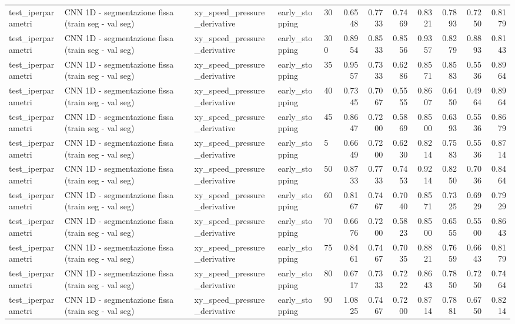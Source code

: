 \documentclass{article}
\begin{document}
\begin{table}[htbp]
\begin{adjustbox}{max width=\textwidth}
\begin{tabular}{lllllrrrrrrr}
test\_iperparametri & CNN 1D - segmentazione fissa (train seg - val seg) & xy\_speed\_pressure\_derivative & early\_stopping & 30 & 0.6548 & 0.7733 & 0.7469 & 0.8321 & 0.7893 & 0.7250 & 0.8179 \\
test\_iperparametri & CNN 1D - segmentazione fissa (train seg - val seg) & xy\_speed\_pressure\_derivative & early\_stopping & 300 & 0.8954 & 0.8533 & 0.8556 & 0.9357 & 0.8279 & 0.8893 & 0.8143 \\
test\_iperparametri & CNN 1D - segmentazione fissa (train seg - val seg) & xy\_speed\_pressure\_derivative & early\_stopping & 35 & 0.9557 & 0.7333 & 0.6286 & 0.8571 & 0.8583 & 0.5536 & 0.8964 \\
test\_iperparametri & CNN 1D - segmentazione fissa (train seg - val seg) & xy\_speed\_pressure\_derivative & early\_stopping & 40 & 0.7345 & 0.7067 & 0.5555 & 0.8607 & 0.6450 & 0.4964 & 0.8964 \\
test\_iperparametri & CNN 1D - segmentazione fissa (train seg - val seg) & xy\_speed\_pressure\_derivative & early\_stopping & 45 & 0.8647 & 0.7200 & 0.5869 & 0.8500 & 0.6393 & 0.5536 & 0.8679 \\
test\_iperparametri & CNN 1D - segmentazione fissa (train seg - val seg) & xy\_speed\_pressure\_derivative & early\_stopping & 5 & 0.6649 & 0.7200 & 0.6230 & 0.8214 & 0.7583 & 0.5536 & 0.8714 \\
test\_iperparametri & CNN 1D - segmentazione fissa (train seg - val seg) & xy\_speed\_pressure\_derivative & early\_stopping & 50 & 0.8733 & 0.7733 & 0.7453 & 0.9214 & 0.8250 & 0.7036 & 0.8464 \\
test\_iperparametri & CNN 1D - segmentazione fissa (train seg - val seg) & xy\_speed\_pressure\_derivative & early\_stopping & 60 & 0.8167 & 0.7467 & 0.7040 & 0.8571 & 0.7325 & 0.6929 & 0.7929 \\
test\_iperparametri & CNN 1D - segmentazione fissa (train seg - val seg) & xy\_speed\_pressure\_derivative & early\_stopping & 70 & 0.6676 & 0.7200 & 0.5823 & 0.8500 & 0.6555 & 0.5500 & 0.8643 \\
test\_iperparametri & CNN 1D - segmentazione fissa (train seg - val seg) & xy\_speed\_pressure\_derivative & early\_stopping & 75 & 0.8461 & 0.7467 & 0.7035 & 0.8821 & 0.7659 & 0.6643 & 0.8179 \\
test\_iperparametri & CNN 1D - segmentazione fissa (train seg - val seg) & xy\_speed\_pressure\_derivative & early\_stopping & 80 & 0.6717 & 0.7333 & 0.7222 & 0.8643 & 0.7850 & 0.7250 & 0.7464 \\
test\_iperparametri & CNN 1D - segmentazione fissa (train seg - val seg) & xy\_speed\_pressure\_derivative & early\_stopping & 90 & 1.0825 & 0.7467 & 0.7200 & 0.8714 & 0.7881 & 0.6750 & 0.8214 \\

\end{tabular}
\end{adjustbox}
\end{table}
\end{document}

